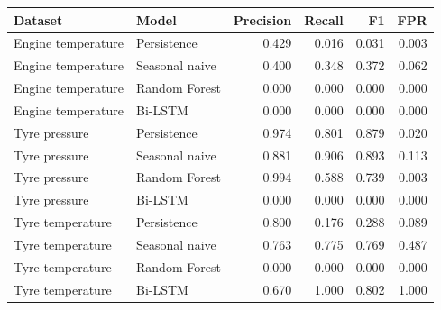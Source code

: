 \begin{tabular}{llrrrr}
\toprule
Dataset & Model & Precision & Recall & F1 & FPR \\
\midrule
Engine temperature & Persistence & 0.429 & 0.016 & 0.031 & 0.003 \\
Engine temperature & Seasonal naive & 0.400 & 0.348 & 0.372 & 0.062 \\
Engine temperature & Random Forest & 0.000 & 0.000 & 0.000 & 0.000 \\
Engine temperature & Bi-LSTM & 0.000 & 0.000 & 0.000 & 0.000 \\
Tyre pressure & Persistence & 0.974 & 0.801 & 0.879 & 0.020 \\
Tyre pressure & Seasonal naive & 0.881 & 0.906 & 0.893 & 0.113 \\
Tyre pressure & Random Forest & 0.994 & 0.588 & 0.739 & 0.003 \\
Tyre pressure & Bi-LSTM & 0.000 & 0.000 & 0.000 & 0.000 \\
Tyre temperature & Persistence & 0.800 & 0.176 & 0.288 & 0.089 \\
Tyre temperature & Seasonal naive & 0.763 & 0.775 & 0.769 & 0.487 \\
Tyre temperature & Random Forest & 0.000 & 0.000 & 0.000 & 0.000 \\
Tyre temperature & Bi-LSTM & 0.670 & 1.000 & 0.802 & 1.000 \\
\bottomrule
\end{tabular}
